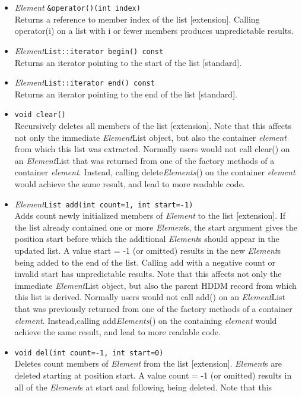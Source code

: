 \documentclass{revtex4}
\begin{document}
\begin{itemize}
\begin{itemize}
\item {\em Element} \texttt{\&operator()(int index)}\\
Returns a reference to member index of the list [extension]. Calling
operator(i) on a list with i or fewer members produces unpredictable results.
\item {\em Element}\texttt{List::iterator begin() const}\\
Returns an iterator pointing to the start of the list [standard].
\item {\em Element}\texttt{List::iterator end() const}\\
Returns an iterator pointing to the end of the list [standard].
\item \texttt{void clear()}\\
Recursively deletes all members of the list [extension]. Note that this
affects not only the immediate {\em Element}List object, but also the container
{\em element} from which this list was extracted. Normally users would not call
clear() on an {\em Element}List that was returned from one of the factory
methods of a container {\em element}. Instead, calling delete{\em Elements}()
on the container {\em element} would achieve the same result, and lead to more
readable code.
\item {\em Element}\texttt{List add(int count=1, int start=-1)}\\
Adds count newly initialized members of {\em Element} to the list [extension]. If
the list already contained one or more {\em Element}s, the start argument gives the
position start before which the additional {\em Element}s should appear in the
updated list. A value start = -1 (or omitted) results in the new {\em Element}s
being added to the end of the list. Calling add with a negative count or
invalid start has unpredictable results. Note that this affects not only the
immediate {\em Element}List object, but also the parent HDDM record from which this
list is derived. Normally users would not call add() on an {\em Element}List that
was previously returned from one of the factory methods of a container
{\em element}. Instead,calling add{\em Elements}() on the containing {\em element}
would achieve the same result, and lead to more readable code.
\item \texttt{void del(int count=-1, int start=0)}\\
Deletes count members of {\em Element} from the list [extension]. {\em Element}s are
deleted starting at position start. A value count = -1 (or omitted) results in
all of the {\em Element}s at start and following being deleted. Note that this

\end{itemize}
\end{itemize}
\end{document}
